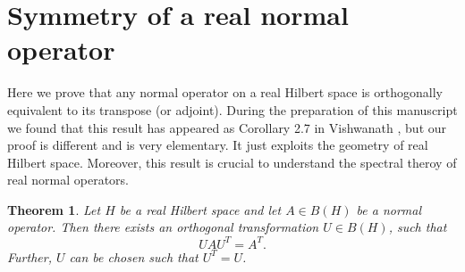 \documentclass[12pt,a4paper,twoside]{article}
\numberwithin{equation}{section}
\theoremstyle{definition}  %
\theoremstyle{plain}  %
\newtheorem{thm}[defn]{Theorem}
\theoremstyle{remark} %
\begin{document}
\section {Symmetry of a real normal operator}
Here we prove that any normal operator on a real Hilbert space is orthogonally equivalent to its transpose (or adjoint). During the preparation of this manuscript we found that this result has appeared as Corollary 2.7 in Vishwanath \cite{Vis78}, but our proof is different and is very elementary. It just exploits the geometry of real Hilbert space. Moreover, this result is crucial to understand the spectral theroy of real normal operators.
\begin{thm} \label{thm:A similar A^T}
Let $H$ be a real Hilbert space and let $A\in B(H)$ be a normal operator. Then there exists an orthogonal transformation $U \in B(H)$, such that
\begin{equation} \label{eq: A similar A^T}
UAU^{T} = A^{T}.
\end{equation}
Further,  $U$ can be chosen such that $U^T = U$.
\end{thm}
\end{document}
